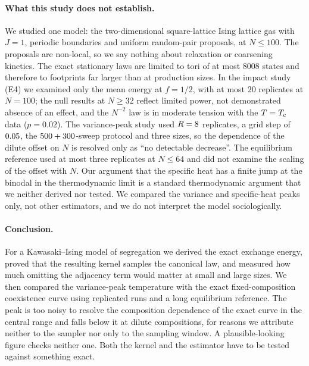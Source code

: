 \paragraph{What this study does not establish.} We studied one model: the two-dimensional square-lattice Ising lattice gas with $J=1$, periodic boundaries and uniform random-pair proposals, at $N\le100$. The proposals are non-local, so we say nothing about relaxation or coarsening kinetics. The exact stationary laws are limited to tori of at most $8008$ states and therefore to footprints far larger than at production sizes. In the impact study (E4) we examined only the mean energy at $f=1/2$, with at most $20$ replicates at $N=100$; the null results at $N\ge32$ reflect limited power, not demonstrated absence of an effect, and the $N^{-2}$ law is in moderate tension with the $T=T_{\mathrm c}$ data ($p=0.02$). The variance-peak study used $R=8$ replicates, a grid step of $0.05$, the $500+300$-sweep protocol and three sizes, so the dependence of the dilute offset on $N$ is resolved only as ``no detectable decrease''. The equilibrium reference used at most three replicates at $N\le64$ and did not examine the scaling of the offset with $N$. Our argument that the specific heat has a finite jump at the binodal in the thermodynamic limit is a standard thermodynamic argument that we neither derived nor tested. We compared the variance and specific-heat peaks only, not other estimators, and we do not interpret the model sociologically.

\paragraph{Conclusion.} For a Kawasaki--Ising model of segregation we derived the exact exchange energy, proved that the resulting kernel samples the canonical law, and measured how much omitting the adjacency term would matter at small and large sizes. We then compared the variance-peak temperature with the exact fixed-composition coexistence curve using replicated runs and a long equilibrium reference. The peak is too noisy to resolve the composition dependence of the exact curve in the central range and falls below it at dilute compositions, for reasons we attribute neither to the sampler nor only to the sampling window. A plausible-looking figure checks neither one. Both the kernel and the estimator have to be tested against something exact.
